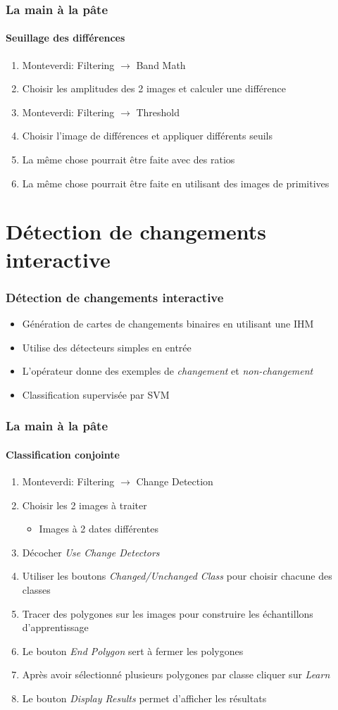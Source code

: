 \documentclass[compress]{beamer}
\begin{document}
\begin{frame}
  \frametitle{La main à la pâte}
  \framesubtitle{Seuillage des différences}
  \begin{enumerate}
  \item Monteverdi: Filtering $\rightarrow$ Band Math
  \item Choisir les amplitudes des 2 images et calculer une différence
  \item Monteverdi: Filtering $\rightarrow$ Threshold
  \item Choisir l'image de différences et appliquer différents seuils
  \item La même chose pourrait être faite avec des ratios
  \item La même chose pourrait être faite en utilisant des images de primitives
  \end{enumerate}
\end{frame}


\section[Application]{Détection de changements interactive}

\begin{frame}
  \frametitle{Détection de changements interactive}
  \begin{itemize}
    \item Génération de cartes de changements binaires en utilisant une
      IHM
    \item Utilise des détecteurs simples en entrée
    \item L'opérateur donne des exemples de {\em changement} et {\em non-changement}
    \item Classification supervisée par SVM
  \end{itemize}
\end{frame}


\begin{frame}
  \frametitle{La main à la pâte}
  \framesubtitle{Classification conjointe}
  \begin{enumerate}
  \item Monteverdi: Filtering $\rightarrow$ Change Detection
  \item Choisir les 2 images à traiter
    \begin{itemize}
    \item Images à 2 dates différentes
    \end{itemize}
  \item Décocher {\em Use Change Detectors}
  \item Utiliser les boutons {\em Changed/Unchanged Class} pour
    choisir chacune des classes
  \item Tracer des polygones sur les images pour construire les
    échantillons d'apprentissage
  \item Le bouton {\em End Polygon} sert à fermer les polygones
  \item Après avoir sélectionné plusieurs polygones par classe cliquer
    sur {\em Learn}
  \item Le bouton {\em Display Results} permet d'afficher les résultats
  \end{enumerate}
\end{frame}
\end{document}
